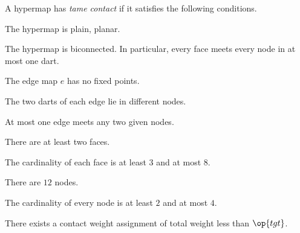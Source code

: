 \begin{definition}
A hypermap has {\it tame contact\/} if it satisfies the following
conditions.
%
%
%
%
%
%
%
%
%
\begin{nomerate}
\item {} The hypermap is plain, planar.
\item {} The hypermap is  biconnected.
  In particular, every face meets every node in at most one dart.
\item {} The edge map $e$ has no fixed points.
\item {} The two darts of each edge lie in different nodes.
\item {} At most one edge meets any two given nodes.
\item {} There are at least two faces.
\item {} The cardinality of each face is at least $3$
  and at most $8$.
\item {} There are $12$ nodes.
\item {} The cardinality of every node is at least $2$
  and at most $4$.
\item {} There exists a contact weight assignment
of total weight less than $\op{tgt}$.
\end{nomerate}
%
\end{definition}



